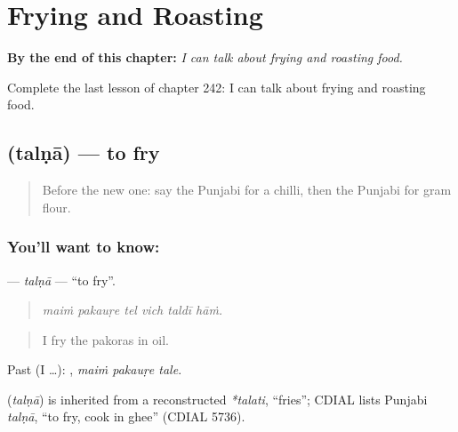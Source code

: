 
\chapter{Frying and Roasting}
\label{ch:pa-a2-frying-and-roasting}

\begin{chapteropening}
\textbf{By the end of this chapter:} \emph{I can talk about frying and roasting food.}

Complete the last lesson of chapter 242: I can talk about frying and roasting food.
\end{chapteropening}

\section[\texorpdfstring{\pa{ਤਲਣਾ} (talṇā)}{ਤਲਣਾ (talṇā)}]{ (talṇā) — to fry}

\label{lesson:PA-C242-talna}



\begin{quote}
Before the new one: say the Punjabi for a chilli, then the Punjabi for gram flour.
\end{quote}

\subsection*{You'll want to know: }
\textbf{} — \emph{talṇā} — \textquotedblleft{}to fry\textquotedblright{}.

\begin{quote}
     
\end{quote}

\begin{quote}
\emph{maiṁ pakauṛe tel vich taldī hāṁ.}
\end{quote}

\begin{quote}
I fry the pakoras in oil.
\end{quote}

Past (I …):   , \emph{maiṁ pakauṛe tale}.

\begin{cousinweb}
\textbf{} (\emph{talṇā}) is inherited from a reconstructed \emph{*talati}, \textquotedblleft{}fries\textquotedblright{}; CDIAL lists Punjabi \emph{talṇā}, \textquotedblleft{}to fry, cook in ghee\textquotedblright{} (CDIAL 5736).
\end{cousinweb}

